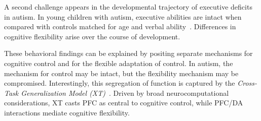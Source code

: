 A second challenge appears in the developmental trajectory of executive deficits in autism. In young children with autism, executive abilities are intact when compared with controls matched for age and verbal ability~\cite{GriffithEM:1999:AutismYoungED}. Differences in cognitive flexibility arise over the course of development.

These behavioral findings can be explained by positing separate mechanisms for cognitive control and for the flexible adaptation of control. In autism, the mechanism for control may be intact, but the flexibility mechanism may be compromised. Interestingly, this segregation of function is captured by the \emph{Cross-Task Generalization Model (XT)}~\cite{RougierNP:2005:XT}. Driven by broad neurocomputational considerations, XT casts PFC as central to cognitive control, while PFC/DA interactions mediate cognitive flexibility.


 
